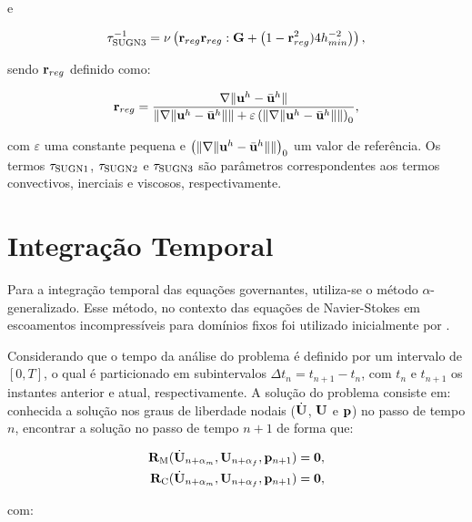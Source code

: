 \documentclass[tese_patricia]{subfiles}%
\begin{document}
\noindent e

\begin{align}
\tau_{\mathrm{SUGN3}}^{-1} = \nu \left(\mathbf{r}_{reg}\mathbf{r}_{reg} : \mathbf{G} + \left(1 - \mathbf{r}_{reg}^2)4h_{min}^{-2} \right)\right) ,
\end{align}

\noindent sendo $\mathbf{r}_{reg}$ definido como:

\begin{align}
\mathbf{r}_{reg} =\frac{\nabla \lVert\mathbf{u}^h - \bar{\mathbf{u}}^h\rVert}{\lVert \nabla \lVert\mathbf{u}^h - \bar{\mathbf{u}}^h\rVert\rVert + \varepsilon\left(\lVert \nabla \lVert\mathbf{u}^h - \bar{\mathbf{u}}^h\rVert\rVert\right)_0},
\end{align}

\noindent com $\varepsilon$ uma constante pequena e $\left(\lVert \nabla \lVert\mathbf{u}^h- \bar{\mathbf{u}}^h\rVert\rVert\right)_0$ um valor de referência. Os termos $\tau_{\mathrm{SUGN1}}$, $\tau_{\mathrm{SUGN2}}$ e $\tau_{\mathrm{SUGN3}}$ são parâmetros correspondentes aos termos convectivos, inerciais e viscosos, respectivamente.


\section{Integração Temporal}\label{sec:IntegTemp}

Para a integração temporal das equações governantes, utiliza-se o método $\alpha$-generalizado. Esse método, no contexto das equações de Navier-Stokes em escoamentos incompressíveis para domínios fixos foi utilizado inicialmente por .

Considerando que o tempo da análise do problema é definido por um intervalo de $[0,T]$, o qual é particionado em subintervalos $\Delta t_{n} = t_{n+1} - t_{n}$, com $t_{n}$ e $t_{n+1}$ os instantes anterior e atual, respectivamente. A solução do problema consiste em: conhecida a solução nos graus de liberdade nodais ($\dot{\mathbf{U}}$, $\mathbf{U}$ e $\mathbf{p}$) no passo de tempo $n$, encontrar a solução no passo de tempo $n+1$ de forma que:

\begin{align}
\mathbf{R}_\mathrm{M}(\dot{\mathbf{U}}_{n+\alpha_m},\mathbf{U}_{n+\alpha_f},\mathbf{p}_{n+1}) = \mathbf{0}, \label{eq:momentum_residual_alpha}\\
\mathbf{R}_\mathrm{C}(\dot{\mathbf{U}}_{n+\alpha_m},\mathbf{U}_{n+\alpha_f},\mathbf{p}_{n+1}) = \mathbf{0}, \label{eq:continuity_residual_alpha}
\end{align}

\noindent com:
\end{document}
